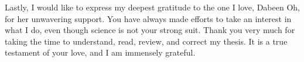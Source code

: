 \begin{otherlanguage}{english}

Lastly, I would like to express my deepest gratitude to the one I love, Dabeen Oh, for her unwavering support. You have always made efforts to take an interest in what I do, even though science is not your strong suit. Thank you very much for taking the time to understand, read, review, and correct my thesis. It is a true testament of your love, and I am immensely grateful.

\endgroup

\clearpage
\mbox{}
\thispagestyle{empty}
\clearpage

%
%
%
%
%
%
%

\end{otherlanguage}
    